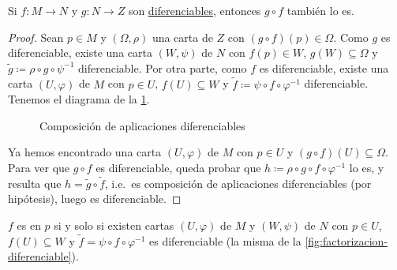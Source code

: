 \documentclass[../VD.tex]{subfiles}
\begin{document}
\begin{lemma}
  Si \(f \colon M \to N\) y \(g \colon N \to Z\) son
  \hyperref[def:diferenciable]{diferenciables}, entonces \(g \circ f\) también
  lo es.
\end{lemma}

\begin{proof}
  Sean \(p \in M\) y \((\Omega,\rho)\) una carta de \(Z\) con \((g \circ f)(p)
  \in \Omega\). Como \(g\) es diferenciable, existe una carta \((W,\psi)\) de
  \(N\) con \(f(p) \in W\), \(g(W) \subseteq \Omega\) y \(\widetilde{g}
  \coloneqq \rho \circ g \circ \psi^{-1}\) diferenciable. Por otra parte, como
  \(f\) es diferenciable, existe una carta \((U,\varphi)\) de \(M\) con \(p \in
  U\), \(f(U) \subseteq W\) y \(\widetilde{f} \coloneqq \psi \circ f \circ
  \varphi^{-1}\) diferenciable. Tenemos el diagrama de la \cref{fig:comp-dif-cd}.

  \begin{figure}[h]
    \centering
    \caption{Composición de aplicaciones diferenciables}
    \label{fig:comp-dif-cd}
  \end{figure}

  Ya hemos encontrado una carta \((U,\varphi)\) de \(M\) con \(p \in U\) y \((g
  \circ f)(U) \subseteq \Omega\).
  Para ver que \(g \circ f\) es diferenciable, queda probar que
  \(h \coloneqq \rho \circ g \circ f \circ \varphi^{-1}\) lo es, y resulta que
  \(h = \widetilde{g} \circ \widetilde{f}\), i.e.\ es composición de aplicaciones
  diferenciables (por hipótesis), luego es diferenciable.
\end{proof}

\begin{lemma}
  \label{lem:dif-caract-exists}
  \(f\) es  en \(p\) si y solo si existen cartas
  \((U,\varphi)\) de \(M\) y \((W,\psi)\) de \(N\) con \(p \in U\), \(f(U)
  \subseteq W\) y \(\widetilde{f} = \psi \circ f \circ \varphi^{-1}\) es
  diferenciable (la misma de la \cref{fig:factorizacion-diferenciable}).
\end{lemma}
\end{document}
